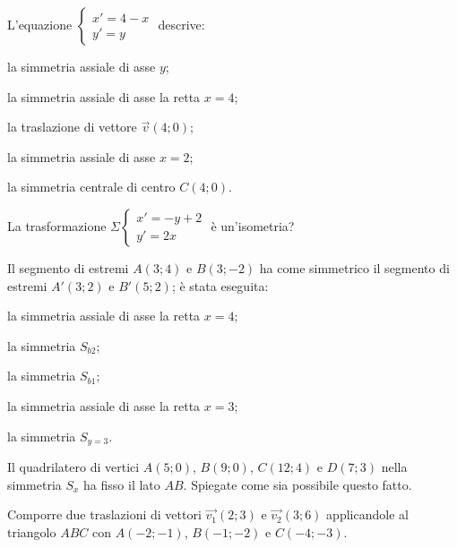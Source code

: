 \begin{esercizio}
	\label{ese:8.87} %
	L'equazione \(\begin{cases}x'=4-x\\y'=y\end{cases}\) descrive: 
	\begin{enumeratea}
		\item la simmetria assiale di asse \(y\);
		\item la simmetria assiale di asse la retta \(x=4\);
		\item la traslazione di vettore \(\vec{v}(4;0)\);
		\item la simmetria assiale di asse \(x=2\);
		\item la simmetria centrale di centro \(C(4;0)\).
	\end{enumeratea}
\end{esercizio}

\begin{esercizio}
	\label{ese:8.88} %
	La trasformazione \(\Sigma \begin{cases}x'=-y+2\\y'=2x\end{cases}\) è 
	un'isometria?
\end{esercizio}

\begin{esercizio}
	\label{ese:8.89} %
	Il segmento di estremi \(A(3;4)\) e \(B(3;-2)\) ha come simmetrico il 
	segmento di estremi \(A'(3;2)\) e \(B'(5;2)\); è stata eseguita:
	\begin{enumeratea}
		\item la simmetria assiale di asse la retta \(x=4\);
		\item la simmetria \(S_{b2}\);
		\item la simmetria \(S_{b1}\);
		\item la simmetria assiale di asse la retta \(x=3\);
		\item la simmetria \(S_{y=3}\).
	\end{enumeratea}
\end{esercizio}

\begin{esercizio}
	\label{ese:8.91} %
	Il quadrilatero di vertici \(A(5;0)\), \(B(9;0)\), \(C(12;4)\) e \(D(7;3)\) 
	nella simmetria \(S_x\) ha fisso il lato \(AB\). Spiegate come sia 
	possibile questo fatto.
\end{esercizio}

\begin{esercizio}
	\label{ese:8.97} %
	Comporre due traslazioni di vettori \(\vec{v_1}(2;3)\) e 
	\(\vec{v_2}(3;6)\) applicandole al triangolo \(ABC\) con \(A(-2;-1)\), 
	\(B(-1;-2)\) e \(C(-4;-3)\).
\end{esercizio}

